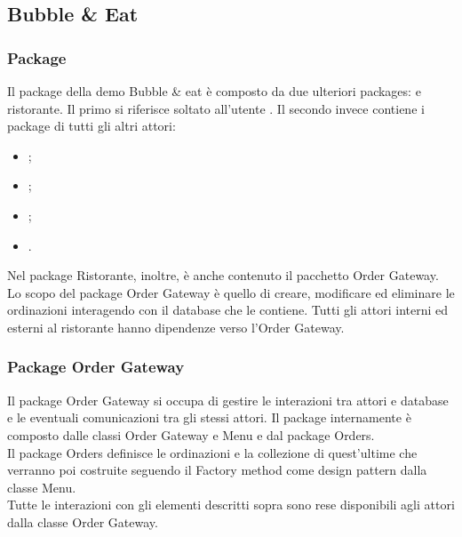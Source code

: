 \subsection{Bubble \& Eat}

\subsubsection{Package}
Il package della demo Bubble \& eat è composto da due ulteriori packages: \Customer{} e ristorante. 
Il primo si riferisce soltato all'utente \Customer{}. Il secondo invece contiene i package di tutti gli altri attori:
\begin{itemize}
	\item \Manager{};
	\item \Chef{};
	\item \Deliveryman{};
	\item \Purchasingmanager{}.
\end{itemize}
Nel package Ristorante, inoltre, è anche contenuto il pacchetto Order Gateway.\\
Lo scopo del package Order Gateway è quello di creare, modificare ed eliminare le ordinazioni interagendo con il database che le contiene.
Tutti gli attori interni ed esterni al ristorante hanno dipendenze verso l’Order Gateway.

\subsubsection{Package Order Gateway}
Il package Order Gateway si occupa di gestire le interazioni tra attori e database e le eventuali comunicazioni tra gli stessi attori. Il package internamente è composto dalle classi Order Gateway e Menu e dal package Orders.\\
Il package Orders definisce le ordinazioni e la collezione di quest’ultime che verranno poi costruite seguendo il Factory method come design pattern dalla classe Menu.\\
Tutte le interazioni con gli elementi descritti sopra sono rese disponibili agli attori dalla classe Order Gateway.

